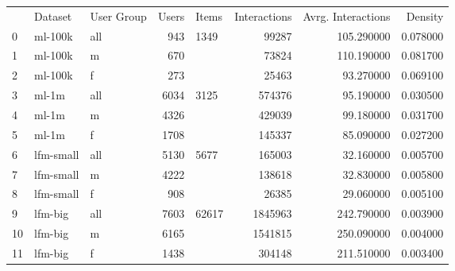 \begin{tabular}{lllrlrrr}
 & Dataset & User Group & Users & Items & Interactions & Avrg. Interactions & Density \\
0 & ml-100k & all & 943 & 1349 & 99287 & 105.290000 & 0.078000 \\
1 & ml-100k & m & 670 &  & 73824 & 110.190000 & 0.081700 \\
2 & ml-100k & f & 273 &  & 25463 & 93.270000 & 0.069100 \\
3 & ml-1m & all & 6034 & 3125 & 574376 & 95.190000 & 0.030500 \\
4 & ml-1m & m & 4326 &  & 429039 & 99.180000 & 0.031700 \\
5 & ml-1m & f & 1708 &  & 145337 & 85.090000 & 0.027200 \\
6 & lfm-small & all & 5130 & 5677 & 165003 & 32.160000 & 0.005700 \\
7 & lfm-small & m & 4222 &  & 138618 & 32.830000 & 0.005800 \\
8 & lfm-small & f & 908 &  & 26385 & 29.060000 & 0.005100 \\
9 & lfm-big & all & 7603 & 62617 & 1845963 & 242.790000 & 0.003900 \\
10 & lfm-big & m & 6165 &  & 1541815 & 250.090000 & 0.004000 \\
11 & lfm-big & f & 1438 &  & 304148 & 211.510000 & 0.003400 \\
\end{tabular}
